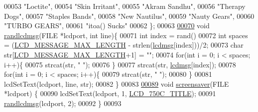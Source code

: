 \begin{DoxyCode}
00053     \textcolor{stringliteral}{"Loctite"},
00054     \textcolor{stringliteral}{"Skin Irritant"},
00055     \textcolor{stringliteral}{"Akram Sandhu"},
00056     \textcolor{stringliteral}{"Therapy Dogs"},
00057     \textcolor{stringliteral}{"Staples Bands"},
00058     \textcolor{stringliteral}{"New Nautilus"},
00059     \textcolor{stringliteral}{"Nauty Gears"},
00060     \textcolor{stringliteral}{"TURBO GEARS"},
00061     \textcolor{stringliteral}{"itoa() Sucks"}
00062 \};
00063 
\hypertarget{lcdmsg_8c_source.tex_l00070}{}\hyperlink{lcdmsg_8h_aabe33dfb797df5997c5e03078591aa81}{00070} \textcolor{keywordtype}{void} \hyperlink{lcdmsg_8c_aabe33dfb797df5997c5e03078591aa81}{randlcdmsg}(FILE *lcdport, \textcolor{keywordtype}{int} line)\{
00071     \textcolor{keywordtype}{int} index = rand() %
00072     \textcolor{keywordtype}{int} spaces = (\hyperlink{lcdmsg_8h_abe4c4b70fc6f44ae3680e5b2c68cdd00}{LCD\_MESSAGE\_MAX\_LENGTH} - strlen(\hyperlink{lcdmsg_8c_abbcf1856a4c9063200ef3f4131fd05f5}{lcdmsg}[index]))/2;
00073     \textcolor{keywordtype}{char} str[\hyperlink{lcdmsg_8h_abe4c4b70fc6f44ae3680e5b2c68cdd00}{LCD\_MESSAGE\_MAX\_LENGTH}+1] = \textcolor{stringliteral}{""};
00074     \textcolor{keywordflow}{for}(\textcolor{keywordtype}{int} i = 0; i < spaces; i++)\{
00075         strcat(str, \textcolor{stringliteral}{" "});
00076     \}
00077     strcat(str, \hyperlink{lcdmsg_8c_abbcf1856a4c9063200ef3f4131fd05f5}{lcdmsg}[index]);
00078     \textcolor{keywordflow}{for}(\textcolor{keywordtype}{int} i = 0; i < spaces; i++)\{
00079         strcat(str, \textcolor{stringliteral}{" "});
00080     \}
00081     lcdSetText(lcdport, line, str);
00082 \}
00083 
\hypertarget{lcdmsg_8c_source.tex_l00089}{}\hyperlink{lcdmsg_8h_acc19fe50b302412c894538965e77cb8b}{00089} \textcolor{keywordtype}{void} \hyperlink{lcdmsg_8c_acc19fe50b302412c894538965e77cb8b}{screensaver}(FILE *lcdport) \{
00090     lcdSetText(lcdport, 1, \hyperlink{lcdmsg_8h_aa9575881ef196e5c94e60d183742eee7}{LCD\_750C\_TITLE});
00091     \hyperlink{lcdmsg_8c_aabe33dfb797df5997c5e03078591aa81}{randlcdmsg}(lcdport, 2);
00092 \}
00093 
\end{DoxyCode}

